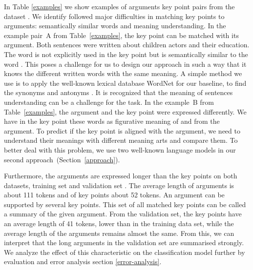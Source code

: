 In Table \ref{examples} we show examples of arguments key point pairs from the \ArgKP dataset \cite{Bar-HaimEFKLS2020}. 
We identify followed major difficulties in matching key points to arguments: semantically similar words and meaning understanding.
In the example pair~A from Table~\ref{examples}, the key point can be matched with its argument. Both sentences were written about children actors and their education. The word  is not explicitly used in the key point but is semantically similar to the word . 
This poses a challenge for us to design our approach in such a way that it knows the different written words with the same meaning. 
A simple method we use is to apply the well-known lexical database WordNet for our baseline, to find the synonyms and antonyms \cite{Miller1995}.
It is recognized that the meaning of sentences understanding can be a challenge for the task. 
In the example~B from Table~\ref{examples}, the argument and the key point were expressed differently. 
We have in the key point these words  as figurative meaning of  and  from the argument. 
To predict if the key point is aligned with the argument, we need to understand their meanings with different meaning arts and compare them. 
To better deal with this problem, we use two well-known language models in our second approach~(Section~\ref{approach}). 

Furthermore, the arguments are expressed longer than the key points on both datasets, training set and validation set . 
The average length of arguments is about 111 tokens and of key points about 52 tokens. 
An argument can be supported by several key points. This set of all matched key points can be called a summary of the given argument. 
From the validation set, the key points have an average length of 41 tokens, lower than in the training data set, while the average length of the arguments remains almost the same. 
From this, we can interpret that the long arguments in the validation set are summarised strongly. 
We analyze the effect of this characteristic on the classification model further by evaluation and error analysis section \ref{error-analysis}.
